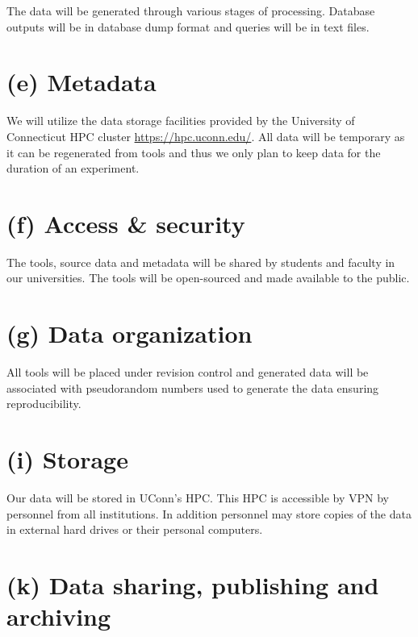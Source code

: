 \documentclass[11pt]{article}
\begin{document}
The data will be generated through various stages of processing. Database outputs will be in database dump format and queries will be in text files.

\noindent
\section*{(e) Metadata}

We will utilize the data storage facilities provided by the University of Connecticut HPC cluster \url{https://hpc.uconn.edu/}.  All data will be temporary as it can be regenerated from tools and thus we only plan to keep data for the duration of an experiment.

\noindent
\section*{(f) Access \& security} 

The tools, source data and metadata will be shared by students and faculty in our universities. The tools will be open-sourced and made available to the public.
\noindent
\section*{(g) Data organization}

All tools will be placed under revision control and generated data will be associated with pseudorandom numbers used to generate the data ensuring reproducibility.

\noindent
\section*{(i) Storage}

Our data will be stored in UConn's HPC. This HPC is accessible by VPN by personnel from all institutions.
In addition personnel may store copies of the data in external hard drives or their personal computers.

%

\noindent
\section*{(k) Data sharing, publishing and archiving}
\end{document}
